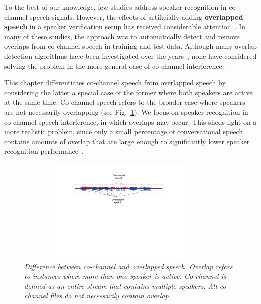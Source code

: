To the best of our knowledge, few studies address speaker recognition in co-channel speech signals. 
However, the effects of artificially adding {\bf overlapped speech} in a speaker verification setup has received considerable attention~\cite{yantorno_report,yantorno_SID,Dwang_03}. 
In many of these studies, the approach was to automatically detect and remove overlaps from co-channel speech in training and test data. 
Although many overlap detection algorithms have been investigated over the years~\cite{Boakye_icassp_08,nav_icassp13,smolenski_tut,sapvr_2000}, none have considered solving the problem in the more general case of co-channel interference. 

This chapter differentiates co-channel speech from overlapped speech by considering the latter a special case of the former where both speakers are active at the same time. 
Co-channel speech refers to the broader case where speakers are not necessarily overlapping (see Fig.~\ref{fig:cochannel_vs_overlap}). 
We focus on speaker recognition in co-channel speech interference, in which overlaps may occur.  
This sheds light on a more realistic problem, since only a small percentage of conversational speech contains amounts of overlap that are large enough to significantly lower speaker recognition performance~\cite{cetin_shriberg_06_icassp,smolenski_tut}. 

\begin{figure}[t!]
	\centering
	\vspace{0mm}
	\includegraphics[height = 2in, width=0.9\textwidth]{figures/cochannel_vs_overlap-crop}
	\vspace{-3mm}
	\caption{\it \small Difference between co-channel and overlapped speech. Overlap refers to instances where more than one speaker is active. Co-channel is defined as an entire stream that contains multiple speakers. All co-channel files do not necessarily contain overlap. }
	\label{fig:cochannel_vs_overlap}
	\vspace{-3mm}
\end{figure}


